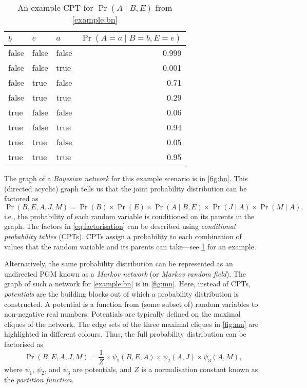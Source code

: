 \begin{table}
  \caption{An example CPT for $\Pr(A \mid B, E)$ from \cref{example:bn}}
  \label{table:examplecpt}
  \centering
  \begin{tabular}[t]{lllr}
    \toprule
    $b$ & $e$ & $a$ & $\Pr(A = a \mid B = b, E = e)$ \\
    \midrule
    false & false & false & 0.999 \\
    false & false & true & 0.001 \\
    false & true & false & 0.71 \\
    false & true & true & 0.29 \\
    true & false & false & 0.06 \\
    true & false & true & 0.94 \\
    true & true & false & 0.05 \\
    true & true & true & 0.95 \\
    \bottomrule
  \end{tabular}
\end{table}

The graph of a \emph{Bayesian network} for this example scenario is in \cref{fig:bn}. This (directed acyclic) graph tells us that the joint probability distribution can be factored as
\begin{equation} \label{eq:factorisation}
  \Pr(B, E, A, J, M) = \Pr(B) \times \Pr(E) \times \Pr(A \mid B, E) \times \Pr(J \mid A) \times \Pr(M \mid A),
\end{equation}
i.e., the probability of each random variable is conditioned on its parents in the graph. The factors in \cref{eq:factorisation} can be described using \emph{conditional probability tables} (CPTs). CPTs assign a probability to each combination of values that the random variable and its parents can take---see \cref{table:examplecpt} for an example.

Alternatively, the same probability distribution can be represented as an undirected PGM known as a \emph{Markov network} (or \emph{Markov random field}). The graph of such a network for \cref{example:bn} is in \cref{fig:mn}. Here, instead of CPTs, \emph{potentials} are the building blocks out of which a probability distribution is constructed. A potential is a function from (some subset of) random variables to non-negative real numbers. Potentials are typically defined on the maximal cliques of the network. The edge sets of the three maximal cliques in \cref{fig:mn} are highlighted in different colours. Thus, the full probability distribution can be factorised as
\[
\Pr(B, E, A, J, M) = \frac{1}{Z} \times \psi_1(B, E, A) \times \psi_2(A, J) \times \psi_3(A, M),
\]
where $\psi_1$, $\psi_2$, and $\psi_3$ are potentials, and $Z$ is a normalisation constant known as the \emph{partition function}.

